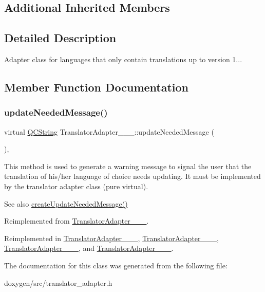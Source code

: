 \subsection*{Additional Inherited Members}


\subsection{Detailed Description}
Adapter class for languages that only contain translations up to version 1... 

\subsection{Member Function Documentation}
\mbox{\label{class_translator_adapter__1__7__5_a6e69d48e79a13c9d934f9af1a8befd8a}} 
\subsubsection{\texorpdfstring{updateNeededMessage()}{updateNeededMessage()}}
{\footnotesize\ttfamily virtual \mbox{\hyperlink{class_q_c_string}{Q\+C\+String}} Translator\+Adapter\+\_\+\_\+\_\+::update\+Needed\+Message (\begin{DoxyParamCaption}{ }\end{DoxyParamCaption})\hspace{0.3cm}{\ttfamily [inline]}, {\ttfamily [virtual]}}

This method is used to generate a warning message to signal the user that the translation of his/her language of choice needs updating. It must be implemented by the translator adapter class (pure virtual).

\begin{DoxySeeAlso}{See also}
\mbox{\hyperlink{class_translator_adapter_base_a71493b87a34d6e4c232e540734aba698}{create\+Update\+Needed\+Message()}} 
\end{DoxySeeAlso}


Reimplemented from \mbox{\hyperlink{class_translator_adapter__1__8__0_a47cedb130d9a178d9c632584d4f2abec}{Translator\+Adapter\+\_\+\_\+\_}}.



Reimplemented in \mbox{\hyperlink{class_translator_adapter__1__4__6_ab19b01d4e00c95ef1e6eb631fbe6ada4}{Translator\+Adapter\+\_\+\_\+\_}}, \mbox{\hyperlink{class_translator_adapter__1__5__4_a587a31dad925e47f206b6a0cda9eedd0}{Translator\+Adapter\+\_\+\_\+\_}}, \mbox{\hyperlink{class_translator_adapter__1__6__0_abc231eb2c1864ca9f878e7e5deb94f54}{Translator\+Adapter\+\_\+\_\+\_}}, and \mbox{\hyperlink{class_translator_adapter__1__6__3_ab3d79abfb926c41bd7609eeb706654fe}{Translator\+Adapter\+\_\+\_\+\_}}.



The documentation for this class was generated from the following file\+:\begin{DoxyCompactItemize}
\item 
doxygen/src/translator\+\_\+adapter.\+h\end{DoxyCompactItemize}
